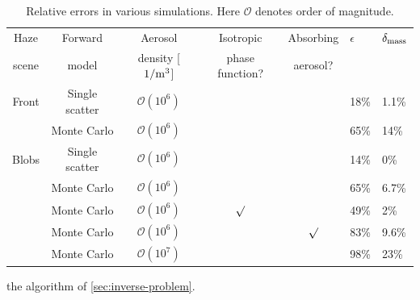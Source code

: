 \documentclass[10pt,letterpaper]{article}
\begin{document}
\begin{table}[t]
  \centering
  \begin{tabular}{cccccgg}
    \toprule
    Haze      & Forward        & Aerosol          & Isotropic       & Absorbing & $\epsilon~~$ & $\delta_{\rm mass}$ \\
    scene     & model          & density [$1/{\rm m}^3$]    & phase function? & aerosol?  &            &  \\
     \midrule
    Front       & Single scatter & ${\mathcal{O}}(10^{6})$         &                 &           & 18\%       & 1.1\%  \\
               & Monte Carlo    & ${\mathcal{O}}(10^{6})$         &                 &           & 65\%       & 14\%  \\
    \cmidrule(r){1-5}
     Blobs       & Single scatter & ${\mathcal{O}}(10^{6})$         &                 &           & 14\%       & 0\%  \\
               & Monte Carlo    & ${\mathcal{O}}(10^{6})$         &                 &           & 65\%       & 6.7\%  \\
               & Monte Carlo    & ${\mathcal{O}}(10^{6})$         & $\surd$         &           & 49\%       & 2\%  \\
               & Monte Carlo    & ${\mathcal{O}}(10^{6})$         &                 & $\surd$   & 83\%       & 9.6\%  \\
               & Monte Carlo    & ${\mathcal{O}}(10^{7})$         &                 &           & 98\%       & 23\%  \\
    \bottomrule
  \end{tabular}
  \caption{Relative errors in various simulations. Here ${\mathcal{O}}$ denotes order of magnitude.}
  \label{tbl:mass}
\end{table}
the algorithm of \cref{sec:inverse-problem}. \\
\end{document}
